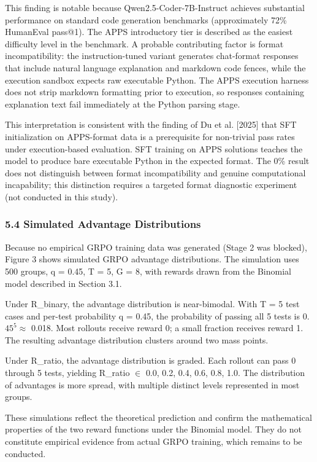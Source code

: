This finding is notable because Qwen2.5-Coder-7B-Instruct achieves substantial performance on standard code generation benchmarks (approximately 72\% HumanEval pass@1). The APPS introductory tier is described as the easiest difficulty level in the benchmark. A probable contributing factor is format incompatibility: the instruction-tuned variant generates chat-format responses that include natural language explanation and markdown code fences, while the execution sandbox expects raw executable Python. The APPS execution harness does not strip markdown formatting prior to execution, so responses containing explanation text fail immediately at the Python parsing stage.

This interpretation is consistent with the finding of Du et al. [2025] that SFT initialization on APPS-format data is a prerequisite for non-trivial pass rates under execution-based evaluation. SFT training on APPS solutions teaches the model to produce bare executable Python in the expected format. The 0\% result does not distinguish between format incompatibility and genuine computational incapability; this distinction requires a targeted format diagnostic experiment (not conducted in this study).

\subsubsection{5.4 Simulated Advantage Distributions}

Because no empirical GRPO training data was generated (Stage 2 was blocked), Figure 3 shows simulated GRPO advantage distributions. The simulation uses 500 groups, q = 0.45, T = 5, G = 8, with rewards drawn from the Binomial model described in Section 3.1.

Under R\_binary, the advantage distribution is near-bimodal. With T = 5 test cases and per-test probability q = 0.45, the probability of passing all 5 tests is 0.$45^5 \approx$ 0.018. Most rollouts receive reward 0; a small fraction receives reward 1. The resulting advantage distribution clusters around two mass points.

Under R\_ratio, the advantage distribution is graded. Each rollout can pass 0 through 5 tests, yielding R\_ratio $\in$ {0.0, 0.2, 0.4, 0.6, 0.8, 1.0}. The distribution of advantages is more spread, with multiple distinct levels represented in most groups.

These simulations reflect the theoretical prediction and confirm the mathematical properties of the two reward functions under the Binomial model. They do not constitute empirical evidence from actual GRPO training, which remains to be conducted.

